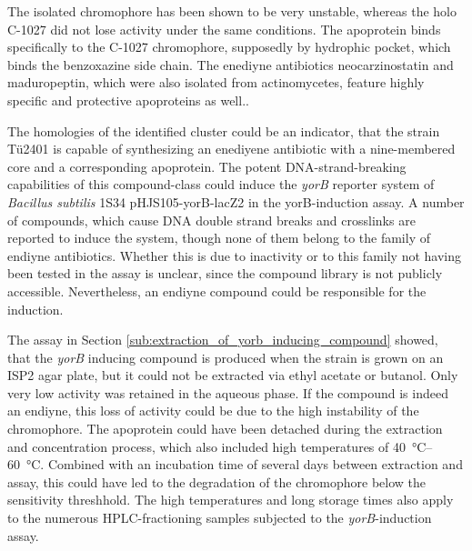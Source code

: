 	 The isolated chromophore has been shown to be very unstable, whereas the holo C-1027 did not lose activity under the same conditions.\autocite{Matsumoto1993,Sugiura1993,Otani1991}
	 The apoprotein binds specifically to the C-1027 chromophore, supposedly by hydrophic pocket, which binds the benzoxazine side chain.\autocite{Okuno1994,Matsumoto1993}
	 The enediyne antibiotics neocarzinostatin and maduropeptin, which were also isolated from actinomycetes, feature highly specific and protective apoproteins as well.\autocite{AdrianL.Smith*1996}.
	 
	 The homologies of the identified cluster could be an indicator, that the strain Tü2401 is capable of synthesizing an enediyene antibiotic with a nine-membered core and a corresponding apoprotein.
	 The potent DNA-strand-breaking capabilities of this compound-class could induce the \textit{yorB} reporter system of \textit{Bacillus subtilis} 1S34 pHJS105-yorB-lacZ2 in the yorB-induction assay.
	 A number of compounds, which cause DNA double strand breaks and crosslinks are reported to induce the system, though none of them belong to the family of endiyne antibiotics.\autocite{Urban2007}
	 Whether this is due to inactivity or to this family not having been tested in the assay is unclear, since the compound library is not publicly accessible.
	 Nevertheless, an endiyne compound could be responsible for the induction.
	 
	 The assay in Section \ref{sub:extraction_of_yorb_inducing_compound} showed, that the \textit{yorB} inducing compound is produced when the strain is grown on an ISP2 agar plate, but it could not be extracted via ethyl acetate or butanol. Only very low activity was retained in the aqueous phase. If the compound is indeed an endiyne, this loss of activity could be due to the high instability of the chromophore. The apoprotein could have been detached during the extraction and concentration process, which also included high temperatures of \SIrange[range-units=single]{40}{60}{\celsius}. Combined with an incubation time of several days between extraction and assay, this could have led to the degradation of the chromophore below the sensitivity threshhold. The high temperatures and long storage times also apply to the numerous HPLC-fractioning samples subjected to the \textit{yorB}-induction assay. 
	 
